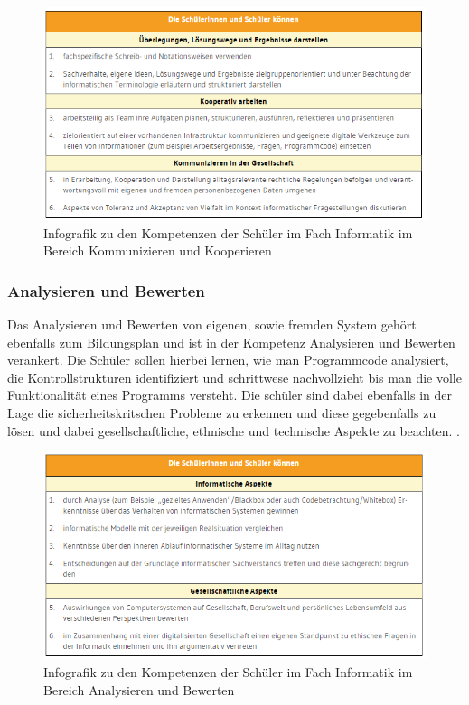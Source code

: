 \begin{figure}[H]
	\centering
	\includegraphics[width=\textwidth,height=\textheight,keepaspectratio]{images/team.png}
	\caption{Infografik zu den Kompetenzen der Schüler im Fach Informatik im Bereich Kommunizieren und Kooperieren \cite{Komm}}
	\label{Kommunizieren und Kooperieren Infografik}
\end{figure}

\subsubsection{Analysieren und Bewerten}

Das Analysieren und Bewerten von eigenen, sowie fremden System gehört ebenfalls zum Bildungsplan und ist in der Kompetenz Analysieren und Bewerten verankert. Die Schüler sollen hierbei lernen, wie man Programmcode analysiert, die Kontrollstrukturen identifiziert und schrittwese nachvollzieht bis man die volle Funktionalität eines Programms versteht. Die schüler sind dabei ebenfalls in der Lage die sicherheitskritschen Probleme zu erkennen und diese gegebenfalls zu lösen und dabei gesellschaftliche, ethnische und technische Aspekte zu beachten.
\cite{Analy}.

\begin{figure}[H]
	\centering
	\includegraphics[width=\textwidth,height=\textheight,keepaspectratio]{images/Analysieren.png}
	\caption{Infografik zu den Kompetenzen der Schüler im Fach Informatik im Bereich Analysieren und Bewerten \cite{Analy}}
	\label{Analysieren und Bewerten Infografik}
\end{figure}

